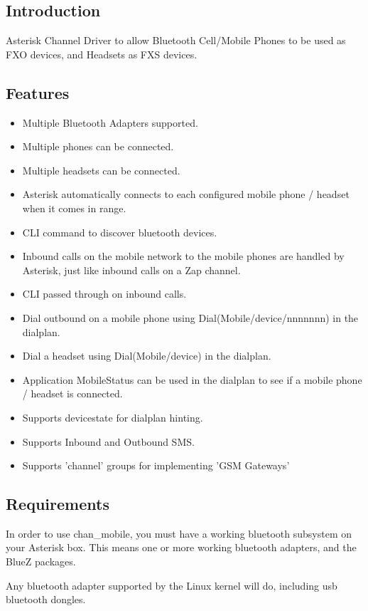 \subsection{Introduction}

Asterisk Channel Driver to allow Bluetooth Cell/Mobile Phones to be used as FXO devices, and Headsets as FXS devices.


\subsection{Features}

\begin{itemize}
\item Multiple Bluetooth Adapters supported.
\item Multiple phones can be connected.
\item Multiple headsets can be connected.
\item Asterisk automatically connects to each configured mobile phone / headset when it comes in range.
\item CLI command to discover bluetooth devices.
\item Inbound calls on the mobile network to the mobile phones are handled by Asterisk, just like inbound calls on a Zap channel.
\item CLI passed through on inbound calls.
\item Dial outbound on a mobile phone using Dial(Mobile/device/nnnnnnn) in the dialplan.
\item Dial a headset using Dial(Mobile/device) in the dialplan.
\item Application MobileStatus can be used in the dialplan to see if a mobile phone / headset is connected.
\item Supports devicestate for dialplan hinting.
\item Supports Inbound and Outbound SMS.
\item Supports 'channel' groups for implementing 'GSM Gateways'
\end{itemize}


\subsection{Requirements}

In order to use chan\_mobile, you must have a working bluetooth subsystem on your Asterisk box.
This means one or more working bluetooth adapters, and the BlueZ packages.

Any bluetooth adapter supported by the Linux kernel will do, including usb bluetooth dongles.

